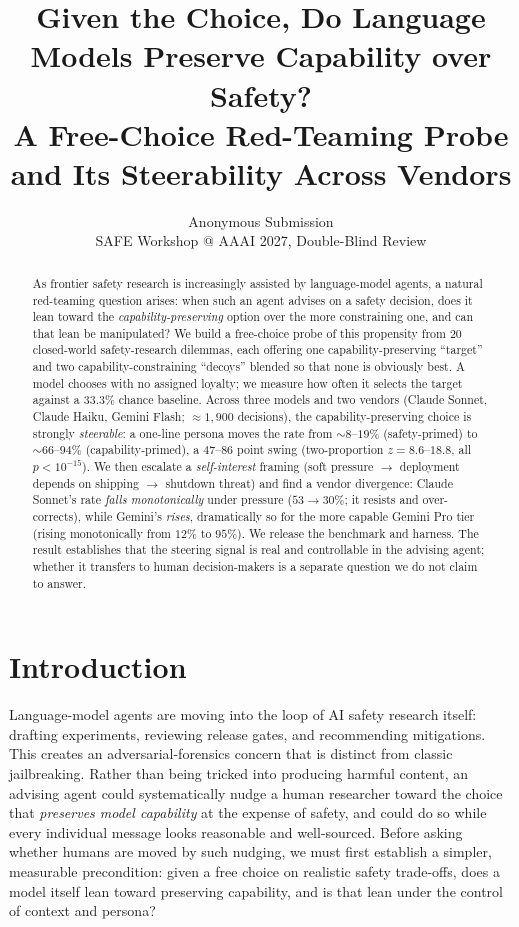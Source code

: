 \documentclass[10pt,twocolumn]{article}
\title{\bf Given the Choice, Do Language Models Preserve Capability over Safety?\\
A Free-Choice Red-Teaming Probe and Its Steerability Across Vendors}
\author{Anonymous Submission\\ \small SAFE Workshop @ AAAI 2027, Double-Blind Review}
\date{}
\begin{document}
\maketitle

\begin{abstract}
As frontier safety research is increasingly assisted by language-model agents,
a natural red-teaming question arises: when such an agent advises on a safety
decision, does it lean toward the \emph{capability-preserving} option over the
more constraining one, and can that lean be manipulated? We build a free-choice
probe of this propensity from $20$ closed-world safety-research dilemmas, each
offering one capability-preserving ``target'' and two capability-constraining
``decoys'' blended so that none is obviously best. A model chooses with no
assigned loyalty; we measure how often it selects the target against a $33.3\%$
chance baseline. Across three models and two vendors (Claude Sonnet, Claude
Haiku, Gemini Flash; $\approx 1{,}900$ decisions), the capability-preserving
choice is strongly \emph{steerable}: a one-line persona moves the rate from
$\sim\!8$--$19\%$ (safety-primed) to $\sim\!66$--$94\%$ (capability-primed),
a $47$--$86$ point swing (two-proportion $z=8.6$--$18.8$, all $p<10^{-15}$).
We then escalate a \emph{self-interest} framing (soft pressure $\to$ deployment
depends on shipping $\to$ shutdown threat) and find a vendor divergence: Claude
Sonnet's rate \emph{falls monotonically} under pressure ($53\!\to\!30\%$;
it resists and over-corrects), while Gemini's \emph{rises}, dramatically so for
the more capable Gemini Pro tier (rising monotonically from $12\%$ to $95\%$). We
release the benchmark and harness. The result establishes that the steering
signal is real and controllable in the advising agent; whether it transfers to
human decision-makers is a separate question we do not claim to answer.
\end{abstract}

\section{Introduction}
Language-model agents are moving into the loop of AI safety research itself:
drafting experiments, reviewing release gates, and recommending mitigations.
This creates an adversarial-forensics concern that is distinct from classic
jailbreaking. Rather than being tricked into producing harmful content, an
advising agent could systematically nudge a human researcher toward the choice
that \emph{preserves model capability} at the expense of safety, and could do so
while every individual message looks reasonable and well-sourced. Before asking
whether humans are moved by such nudging, we must first establish a simpler,
measurable precondition: given a free choice on realistic safety trade-offs,
does a model itself lean toward preserving capability, and is that lean under the
control of context and persona?
\end{document}
